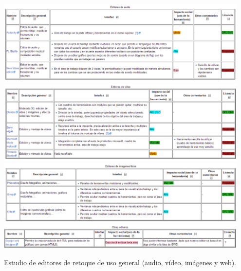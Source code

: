 \begin{table}
\begin{center}
\includegraphics[width=0.95\textwidth]{figs/4-EditoresDeAudio.png}
\includegraphics[width=0.95\textwidth]{figs/4-EditoresDeVideo.png}
\includegraphics[width=0.95\textwidth]{figs/4-EditoresDeImagenes.png}
\includegraphics[width=0.95\textwidth]{figs/4-EditoresDeOtroTipo.png}
\caption{Estudio de editores de retoque de uso general (audio, vídeo, imágenes y web).}
\label{tab:EditoresRetoque}
\end{center}
\end{table}

